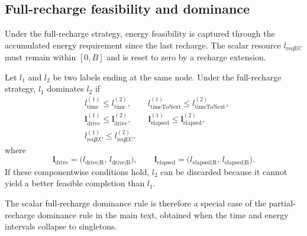 \documentclass[3p,11pt,authoryear]{elsarticle}  %
\begin{document}

\subsection{Full-recharge feasibility and dominance}


Under the full-recharge strategy, energy feasibility is captured through the accumulated energy requirement since the last recharge. The scalar resource \(l_{\text{reqEC}}\) must remain within \([0,B]\) and is reset to zero by a recharge extension.

Let \(l_1\) and \(l_2\) be two labels ending at the same node. Under the full-recharge strategy, \(l_1\) dominates \(l_2\) if
\[
\begin{aligned}
&l_{\text{time}}^{(1)} \le l_{\text{time}}^{(2)},\qquad
l_{\text{timeToNext}}^{(1)} \le l_{\text{timeToNext}}^{(2)},\\
&\mathbf{l}_{\text{drive}}^{(1)} \le \mathbf{l}_{\text{drive}}^{(2)},\qquad
\mathbf{l}_{\text{elapsed}}^{(1)} \le \mathbf{l}_{\text{elapsed}}^{(2)},\\
&l_{\text{reqEC}}^{(1)} \le l_{\text{reqEC}}^{(2)}.
\end{aligned}
\]
where 
\[
\mathbf{l}_{\text{drive}}
=
\bigl(l_{\text{drive|R}},\,l_{\text{drive|B}}\bigr),
\qquad
\mathbf{l}_{\text{elapsed}}
=
\bigl(l_{\text{elapsed|R}},\,l_{\text{elapsed|B}}\bigr).
\]
If these componentwise conditions hold, \(l_2\) can be discarded because it cannot yield a better feasible completion than \(l_1\).

The scalar full-recharge dominance rule is therefore a special case of the partial-recharge dominance rule in the main text, obtained when the time and energy intervals collapse to singletons.

 
\end{document}
